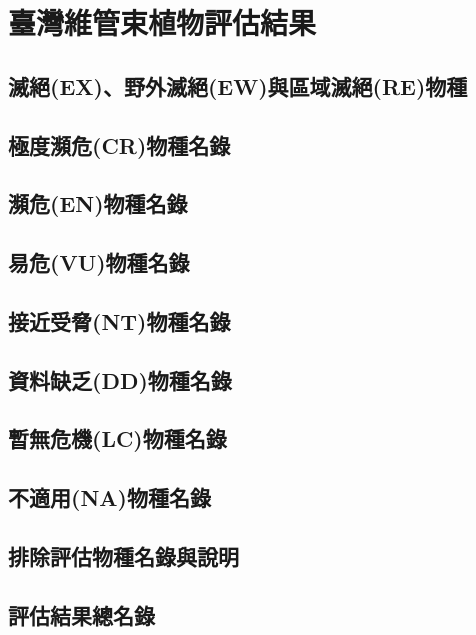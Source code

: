 \chapter{臺灣維管束植物評估結果}


\section{滅絕(EX)、野外滅絕(EW)與區域滅絕(RE)物種}
\section{極度瀕危(CR)物種名錄}
\section{瀕危(EN)物種名錄}
\section{易危(VU)物種名錄}
\section{接近受脅(NT)物種名錄}
\section{資料缺乏(DD)物種名錄}
\section{暫無危機(LC)物種名錄}
\section{不適用(NA)物種名錄}
\section{排除評估物種名錄與說明}

\section{評估結果總名錄}
\begin{multicols}{2}

\end{multicols}
